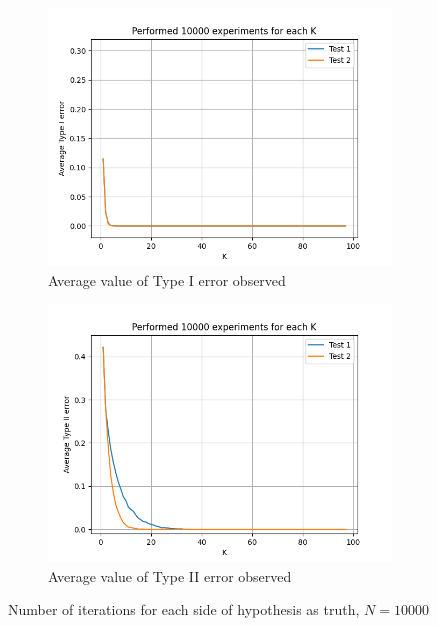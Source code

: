 \documentclass[fleqn, 11pt]{article}
\begin{document}
\vspace{0pt}
\begin{figure}[H]
    \centering
    \begin{subfigure}[H]{0.49\textwidth}
        \centering
        \includegraphics[width=\textwidth]{P3/type1_10000.png}
        \caption[]{Average value of Type I error observed}
    \end{subfigure}
    \begin{subfigure}[H]{0.49\textwidth}
        \centering
        \includegraphics[width=\textwidth]{P3/type2_10000.png}
        \caption[]{Average value of Type II error observed}
    \end{subfigure}
    \caption{Number of iterations for each side of hypothesis as truth, $N = 10000$}
\end{figure}
\end{document}
